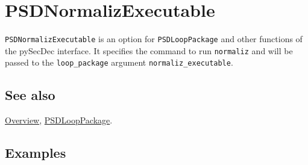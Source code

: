 \documentclass[../FeynHelpersManual.tex]{subfiles}
\begin{document}
\hypertarget{psdnormalizexecutable}{
\section{PSDNormalizExecutable}\label{psdnormalizexecutable}}

\texttt{PSDNormalizExecutable} is an option for \texttt{PSDLoopPackage}
and other functions of the pySecDec interface. It specifies the command
to run \texttt{normaliz} and will be passed to the \texttt{loop_package}
argument \texttt{normaliz_executable}.

\subsection{See also}

\hyperlink{toc}{Overview}, \hyperlink{psdlooppackage}{PSDLoopPackage}.

\subsection{Examples}
\end{document}
